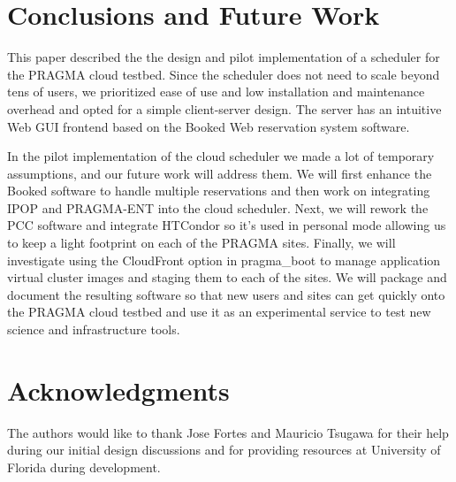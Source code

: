 \documentclass{acm_proc_article-sp}
\begin{document}
\section{Conclusions and Future Work}
\label{Sec:Conclusions}

This paper described the the design and pilot implementation of a  scheduler for the PRAGMA cloud testbed.  Since the scheduler does not need to scale beyond tens of users, we prioritized ease of use and low installation and maintenance overhead and opted for a simple client-server design.  The server has an intuitive Web GUI frontend based on the Booked Web reservation system software.  

In the pilot implementation of the cloud scheduler  we made a lot of temporary assumptions, and  our future work will address them.  We will first enhance the Booked software to handle multiple reservations and then work on integrating IPOP and PRAGMA-ENT into the cloud scheduler.  Next, we will rework the PCC software and integrate HTCondor so it's used in personal mode allowing us to keep a light footprint on each of the PRAGMA sites.  Finally, we will investigate using the CloudFront option in pragma\_boot to manage application virtual cluster images and staging them to each of the sites.     We will package and document the resulting software so that new users and sites can get quickly onto the PRAGMA cloud testbed and use it as an experimental service to test new science and infrastructure tools.


\section{Acknowledgments}

The authors would like to thank Jose Fortes and Mauricio Tsugawa for their help during our initial design discussions and for providing resources at University of Florida during development.


  
\end{document}
